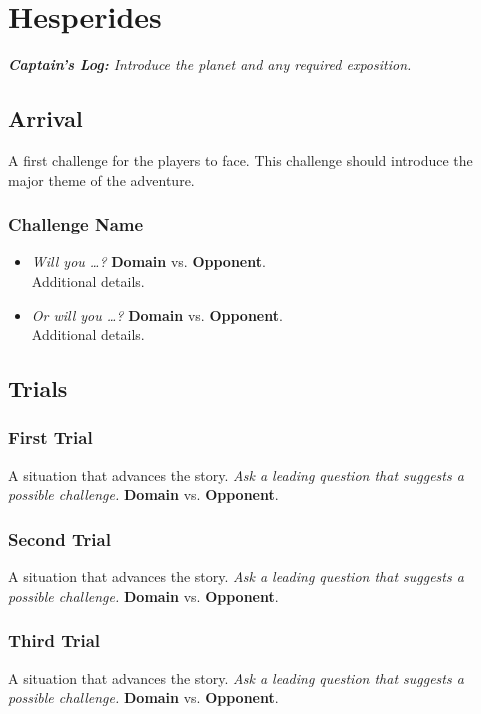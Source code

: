 \documentclass[11pt, a5paper, parskip=half-, DIV=12]{scrartcl}
\begin{document}
\section*{Hesperides}
\textit{\textbf{Captain's Log:} Introduce the planet and any required exposition.}

\subsection*{Arrival}
A first challenge for the players to face.  This challenge should introduce the major theme of the adventure.

\subsubsection*{Challenge Name}
\begin{itemize}
	\item \textit{Will you \dots?} \textbf{Domain} vs. \textbf{Opponent}. \\ Additional details.
	\item \textit{Or will you \ldots?} \textbf{Domain} vs. \textbf{Opponent}. \\ Additional details.  
\end{itemize}

\newpage

\subsection*{Trials}
\subsubsection*{First Trial}
A situation that advances the story. \textit{Ask a leading question that suggests a possible challenge.} \textbf{Domain} vs. \textbf{Opponent}.

\subsubsection*{Second Trial}
A situation that advances the story. \textit{Ask a leading question that suggests a possible challenge.} \textbf{Domain} vs. \textbf{Opponent}.

\subsubsection*{Third Trial}
A situation that advances the story. \textit{Ask a leading question that suggests a possible challenge.} \textbf{Domain} vs. \textbf{Opponent}.
\end{document}
